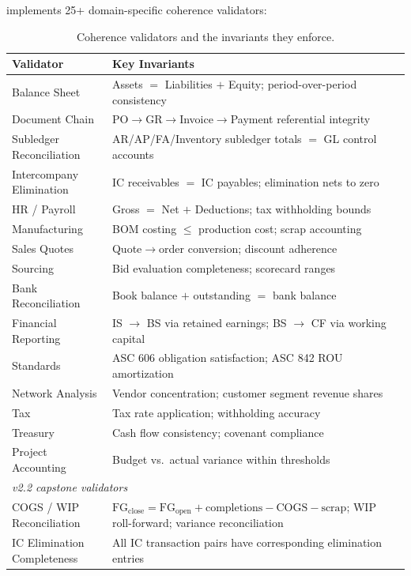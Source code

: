 \system{} implements 25+ domain-specific coherence validators:

\begin{table}[H]
\centering
\caption{Coherence validators and the invariants they enforce.}
\label{tab:validators}
\small
\begin{tabular}{p{3.2cm}p{9cm}}
\toprule
\textbf{Validator} & \textbf{Key Invariants} \\
\midrule
Balance Sheet &
  Assets $=$ Liabilities $+$ Equity; period-over-period consistency \\
Document Chain &
  PO$\to$GR$\to$Invoice$\to$Payment referential integrity \\
Subledger Reconciliation &
  AR/AP/FA/Inventory subledger totals $=$ GL control accounts \\
Intercompany Elimination &
  IC receivables $=$ IC payables; elimination nets to zero \\
HR / Payroll &
  Gross $=$ Net $+$ Deductions; tax withholding bounds \\
Manufacturing &
  BOM costing $\leq$ production cost; scrap accounting \\
Sales Quotes &
  Quote$\to$order conversion; discount adherence \\
Sourcing &
  Bid evaluation completeness; scorecard ranges \\
Bank Reconciliation &
  Book balance $+$ outstanding $=$ bank balance \\
Financial Reporting &
  IS $\to$ BS via retained earnings; BS $\to$ CF via working capital \\
Standards &
  ASC 606 obligation satisfaction; ASC 842 ROU amortization \\
Network Analysis &
  Vendor concentration; customer segment revenue shares \\
Tax &
  Tax rate application; withholding accuracy \\
Treasury &
  Cash flow consistency; covenant compliance \\
Project Accounting &
  Budget vs.\ actual variance within thresholds \\
\midrule
\multicolumn{2}{l}{\textit{v2.2 capstone validators}} \\
\midrule
COGS / WIP Reconciliation &
  $\text{FG}_{\text{close}} = \text{FG}_{\text{open}} + \text{completions} - \text{COGS} - \text{scrap}$; WIP roll-forward; variance reconciliation \\
IC Elimination Completeness &
  All IC transaction pairs have corresponding elimination entries \\

\end{tabular}
\end{table}
